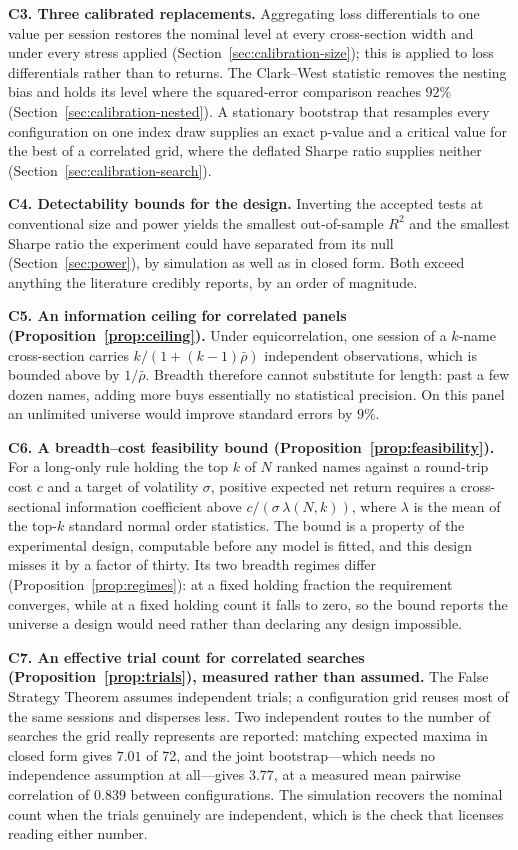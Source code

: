 \documentclass{article}
\theoremstyle{plain}
\theoremstyle{remark}
\begin{document}
\textbf{C3. Three calibrated replacements.} Aggregating loss differentials to
one value per session restores the nominal level at every cross-section width
and under every stress applied (Section~\ref{sec:calibration-size}); this is
\citet{fama1973} applied to loss differentials rather than to returns. The
Clark--West statistic \citep{clark2007} removes the nesting bias and holds its
level where the squared-error comparison reaches $92\%$
(Section~\ref{sec:calibration-nested}). A stationary bootstrap that resamples
every configuration on one index draw supplies an exact p-value and a critical
value for the best of a correlated grid, where the deflated Sharpe ratio
supplies neither (Section~\ref{sec:calibration-search}).

\textbf{C4. Detectability bounds for the design.} Inverting the accepted tests
at conventional size and power yields the smallest out-of-sample $R^2$ and the
smallest Sharpe ratio the experiment could have separated from its null
(Section~\ref{sec:power}), by simulation as well as in closed form. Both exceed
anything the literature credibly reports, by an order of magnitude.

\textbf{C5. An information ceiling for correlated panels
(Proposition~\ref{prop:ceiling}).} Under equicorrelation, one session of a
$k$-name cross-section carries $k / (1 + (k-1)\bar\rho)$ independent
observations, which is bounded above by $1/\bar\rho$. Breadth therefore cannot
substitute for length: past a few dozen names, adding more buys essentially no
statistical precision. On this panel an unlimited universe would improve
standard errors by $9\%$.

\textbf{C6. A breadth--cost feasibility bound
(Proposition~\ref{prop:feasibility}).} For a long-only rule holding the top $k$
of $N$ ranked names against a round-trip cost $c$ and a target of volatility
$\sigma$, positive expected net return requires a cross-sectional information
coefficient above $c / (\sigma\,\lambda(N,k))$, where $\lambda$ is the mean of
the top-$k$ standard normal order statistics. The bound is a property of the
experimental design, computable before any model is fitted, and this design
misses it by a factor of thirty. Its two breadth regimes differ
(Proposition~\ref{prop:regimes}): at a fixed holding fraction the requirement
converges, while at a fixed holding count it falls to zero, so the bound reports
the universe a design would need rather than declaring any design impossible.

\textbf{C7. An effective trial count for correlated searches
(Proposition~\ref{prop:trials}), measured rather than assumed.} The False
Strategy Theorem assumes independent trials; a configuration grid reuses most of
the same sessions and disperses less. Two independent routes to the number of
searches the grid really represents are reported: matching expected maxima in
closed form gives $7.01$ of 72, and the joint bootstrap---which needs no
independence assumption at all---gives $3.77$, at a measured mean pairwise
correlation of $0.839$ between configurations. The simulation recovers the
nominal count when the trials genuinely are independent, which is the check that
licenses reading either number.
\end{document}
